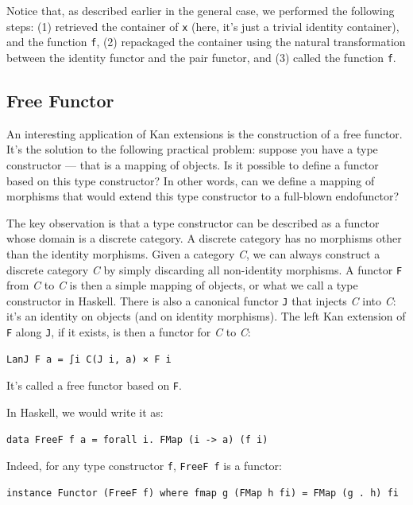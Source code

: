 Notice that, as described earlier in the general case, we performed the
following steps: (1) retrieved the container of \texttt{x} (here, it's
just a trivial identity container), and the function \texttt{f}, (2)
repackaged the container using the natural transformation between the
identity functor and the pair functor, and (3) called the function
\texttt{f}.

\subsection{Free Functor}\label{free-functor}

An interesting application of Kan extensions is the construction of a
free functor. It's the solution to the following practical problem:
suppose you have a type constructor --- that is a mapping of objects. Is
it possible to define a functor based on this type constructor? In other
words, can we define a mapping of morphisms that would extend this type
constructor to a full-blown endofunctor?

The key observation is that a type constructor can be described as a
functor whose domain is a discrete category. A discrete category has no
morphisms other than the identity morphisms. Given a category \emph{C},
we can always construct a discrete category \emph{\textbar{}C\textbar{}}
by simply discarding all non-identity morphisms. A functor \texttt{F}
from \emph{\textbar{}C\textbar{}} to \emph{C} is then a simple mapping
of objects, or what we call a type constructor in Haskell. There is also
a canonical functor \texttt{J} that injects \emph{\textbar{}C\textbar{}}
into \emph{C}: it's an identity on objects (and on identity morphisms).
The left Kan extension of \texttt{F} along \texttt{J}, if it exists, is
then a functor for \emph{C} to \emph{C}:

\begin{verbatim}
LanJ F a = ∫i C(J i, a) × F i
\end{verbatim}

It's called a free functor based on \texttt{F}.

In Haskell, we would write it as:

\begin{verbatim}
data FreeF f a = forall i. FMap (i -> a) (f i)
\end{verbatim}

Indeed, for any type constructor \texttt{f}, \texttt{FreeF\ f} is a
functor:

\begin{verbatim}
instance Functor (FreeF f) where fmap g (FMap h fi) = FMap (g . h) fi
\end{verbatim}

